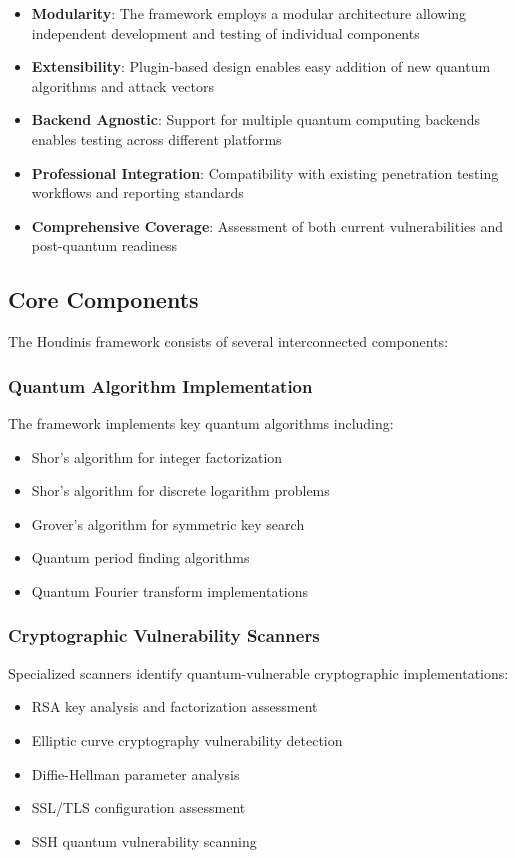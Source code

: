 \documentclass[11pt]{article}
\begin{document}
\begin{itemize}
\item \textbf{Modularity}: The framework employs a modular architecture allowing independent development and testing of individual components
\item \textbf{Extensibility}: Plugin-based design enables easy addition of new quantum algorithms and attack vectors
\item \textbf{Backend Agnostic}: Support for multiple quantum computing backends enables testing across different platforms
\item \textbf{Professional Integration}: Compatibility with existing penetration testing workflows and reporting standards
\item \textbf{Comprehensive Coverage}: Assessment of both current vulnerabilities and post-quantum readiness
\end{itemize}

\subsection{Core Components}

The Houdinis framework consists of several interconnected components:

\subsubsection{Quantum Algorithm Implementation}
The framework implements key quantum algorithms including:
\begin{itemize}
\item Shor's algorithm for integer factorization
\item Shor's algorithm for discrete logarithm problems
\item Grover's algorithm for symmetric key search
\item Quantum period finding algorithms
\item Quantum Fourier transform implementations
\end{itemize}

\subsubsection{Cryptographic Vulnerability Scanners}
Specialized scanners identify quantum-vulnerable cryptographic implementations:
\begin{itemize}
\item RSA key analysis and factorization assessment
\item Elliptic curve cryptography vulnerability detection
\item Diffie-Hellman parameter analysis
\item SSL/TLS configuration assessment
\item SSH quantum vulnerability scanning
\end{itemize}
\end{document}
